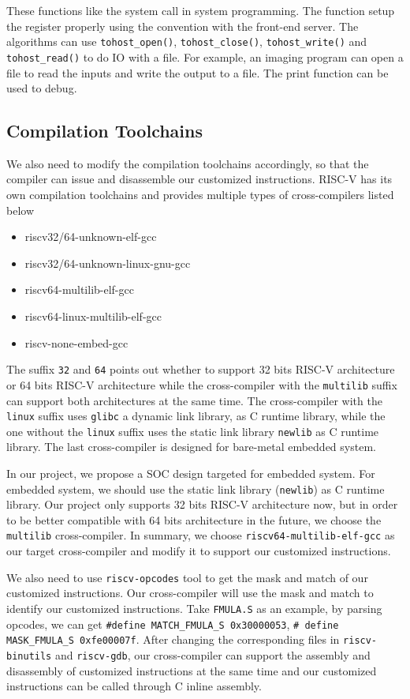 These functions like the system call in system programming. The function setup the register properly using the convention with the front-end server. The algorithms can use \texttt{tohost\_open()}, \texttt{tohost\_close()}, \texttt{tohost\_write()} and \texttt{tohost\_read()} to do IO with a file. For example, an imaging program can open a file to read the inputs and write the output to a file. The print function can be used to debug.

\subsection{Compilation Toolchains} %
We also need to modify the compilation toolchains accordingly, so that the compiler can issue and disassemble our customized instructions. RISC-V has its own compilation toolchains and provides multiple types of cross-compilers listed below 
\begin{itemize}
    \item riscv32/64-unknown-elf-gcc
    \item riscv32/64-unknown-linux-gnu-gcc
    \item riscv64-multilib-elf-gcc
    \item riscv64-linux-multilib-elf-gcc
    \item riscv-none-embed-gcc
\end{itemize}

The suffix \texttt{32} and \texttt{64} points out whether to support 32 bits RISC-V architecture or 64 bits RISC-V architecture while the cross-compiler with the \texttt{multilib} suffix can support both architectures at the same time. The cross-compiler with the \texttt{linux} suffix uses \texttt{glibc} a dynamic link library, as C runtime library, while the one without the \texttt{linux} suffix uses the static link library \texttt{newlib} as C runtime library. The last cross-compiler is designed for bare-metal embedded system. 

In our project, we propose a SOC design targeted for embedded system. For embedded system, we should use the static link library (\texttt{newlib}) as C runtime library. Our project only supports 32 bits RISC-V architecture now, but in order to be better compatible with 64 bits architecture in the future, we choose the \texttt{multilib} cross-compiler.  In summary, we choose \texttt{riscv64-multilib-elf-gcc} as our target cross-compiler and modify it to support our customized instructions. 

We also need to use \texttt{riscv-opcodes} tool to get the mask and match of our customized instructions. Our cross-compiler will use the mask and match to identify our customized instructions. Take \texttt{FMULA.S} as an example, by parsing opcodes, we can get \texttt{\#define MATCH\_FMULA\_S 0x30000053}, \texttt{\# define MASK\_FMULA\_S 0xfe00007f}. After changing the corresponding files in \texttt{riscv-binutils} and \texttt{riscv-gdb}, our cross-compiler can support the assembly and disassembly of customized instructions at the same time and our customized instructions can be called through C inline assembly.

